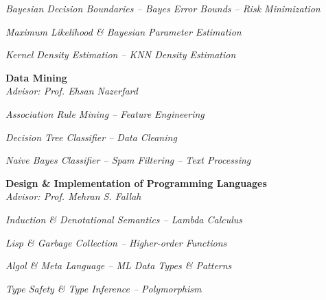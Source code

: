 \documentclass[margin, 10pt]{res} %
\begin{document}
\begin{resume}
\begin{innerlist}
			\item \textit{Bayesian Decision Boundaries -- Bayes Error Bounds -- Risk Minimization} \href{https://github.com/aligholamee/Patterns/raw/master/docs/assignment-2/SPR_9531504_HW2.pdf}{\hfill\UrlFont[docs]}

			\item \textit{Maximum Likelihood \& Bayesian Parameter Estimation} \href{https://github.com/aligholamee/Patterns/raw/master/docs/assignment-3/SPR_9531504_HW3.pdf}{\hfill\UrlFont[docs]}
			
			
			\item \textit{Kernel Density Estimation -- KNN Density Estimation} \href{https://github.com/aligholamee/Patterns/raw/master/docs/assignment-4/SPR_9531504_HW4.pdf}{\hfill\UrlFont[docs]}
		\end{innerlist}

        \textbf{Data Mining}\\
		\textit{Advisor: Prof. Ehsan Nazerfard}
		\begin{innerlist}
			\item \textit{Association Rule Mining -- Feature Engineering} \href{https://github.com/aligholamee/Datadigger/raw/master/docs/assignment-1/report/DM_9531504_HW1.pdf}{\hfill\UrlFont[docs]}
			
			\item \textit{Decision Tree Classifier -- Data Cleaning} \href{https://github.com/aligholamee/Datadigger/raw/master/docs/assignment-2/report/DM_9531504_HW2.pdf}{\hfill\UrlFont[docs]}
			
			\item \textit{Naive Bayes Classifier -- Spam Filtering -- Text Processing} \href{https://github.com/aligholamee/Datadigger/raw/master/docs/assignment-3/report/DM_9531504_HW3.pdf}{\hfill\UrlFont[docs]}
		\end{innerlist}

        \textbf{Design \& Implementation of Programming Languages}\\
    	\textit{Advisor: Prof. Mehran S. Fallah}
	    \begin{innerlist}
	    	\item \textit{Induction \& Denotational Semantics -- Lambda Calculus} \href{https://github.com/aligholamee/HALFLIFE/raw/master/reports/PL29531504.pdf}{\hfill\UrlFont[docs]}
	    	\item \textit{Lisp \& Garbage Collection -- Higher-order Functions} \href{https://github.com/aligholamee/HALFLIFE/raw/master/reports/PL39531504.pdf}{\hfill\UrlFont[docs]}
	    	\item \textit{Algol \& Meta Language -- ML Data Types \& Patterns} \href{https://github.com/aligholamee/HALFLIFE/raw/master/reports/PL49531504.pdf}{\hfill\UrlFont[docs]}
	    	\item \textit{Type Safety \& Type Inference -- Polymorphism} \href{https://github.com/aligholamee/HALFLIFE/raw/master/reports/PL49531504.pdf}{\hfill\UrlFont[docs]}
	    \end{innerlist}


\end{resume}
\end{document}
